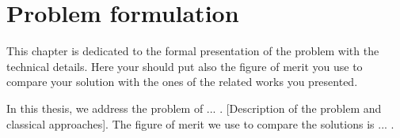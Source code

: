 \chapter{Problem formulation}
\label{ch:problem_formulation}

This chapter is dedicated to the formal presentation of the problem with the technical details. Here your should put also the figure of merit you use to compare your solution with the ones of the related works you presented.

\begin{example}
In this thesis, we address the problem of ... . [Description of the problem and classical approaches]. The figure of merit we use to compare the solutions is ... .
\end{example}
